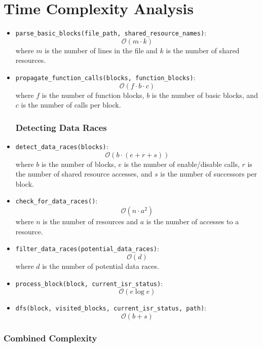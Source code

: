 \documentclass[
fancyheadings, %
%
%
]{stsreprt}
\begin{document}
{\section*{Time Complexity Analysis}
\begin{itemize}
	\subsubsection*{Parsing and Setting Up}
	\item \texttt{parse\_basic\_blocks(file\_path, shared\_resource\_names)}: 
	\[
	\mathcal{O}(m \cdot k)
	\]
	where \(m\) is the number of lines in the file and \(k\) is the number of shared resources.
	
	\item \texttt{propagate\_function\_calls(blocks, function\_blocks)}: 
	\[
	\mathcal{O}(f \cdot b \cdot c)
	\]
	where \(f\) is the number of function blocks, \(b\) is the number of basic blocks, and \(c\) is the number of calls per block.
	
	\subsubsection*{Detecting Data Races}
	\item \texttt{detect\_data\_races(blocks)}: 
	\[
	\mathcal{O}(b \cdot (e + r + s))
	\]
	where \(b\) is the number of blocks, \(e\) is the number of enable/disable calls, \(r\) is the number of shared resource accesses, and \(s\) is the number of successors per block.
	
	\item \texttt{check\_for\_data\_races()}: 
	\[
	\mathcal{O}(n \cdot a^2)
	\]
	where \(n\) is the number of resources and \(a\) is the number of accesses to a resource.
	
	\item \texttt{filter\_data\_races(potential\_data\_races)}: 
	\[
	\mathcal{O}(d)
	\]
	where \(d\) is the number of potential data races.
	
	\item \texttt{process\_block(block, current\_isr\_status)}: 
	\[
	\mathcal{O}(e \log e)
	\]
	
	\item \texttt{dfs(block, visited\_blocks, current\_isr\_status, path)}: 
	\[
	\mathcal{O}(b + s)
	\]
\end{itemize}

\subsubsection*{Combined Complexity}

}
\end{document}
